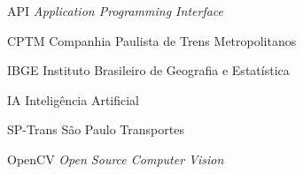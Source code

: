 \begin{siglas}
    \item[API] \textit{Application Programming Interface}
	\item[CPTM] {Companhia Paulista de Trens Metropolitanos}
	\item[IBGE] {Instituto Brasileiro de Geografia e Estatística}
	\item[IA]  {Inteligência Artificial}
	\item[SP-Trans] {São Paulo Transportes}
	\item[OpenCV] \textit{Open Source Computer Vision}

\end{siglas}
